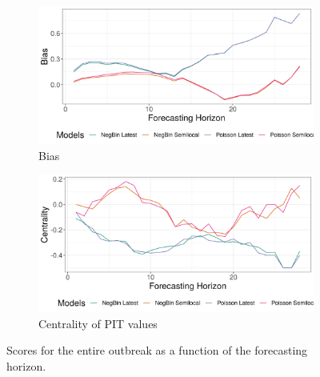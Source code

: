 \begin{figure}[H]
\begin{subfigure}{0.5\textwidth}
  \centering
  \includegraphics[width=\linewidth]{../output/Kayna_bias.png}  
  \caption{Bias}
  \label{fig:sub-third}
\end{subfigure}
\begin{subfigure}{0.5\textwidth}
  \centering
  \includegraphics[width=\linewidth]{../output/Kayna_centrality.png}  
  \caption{Centrality of PIT values}
  \label{fig:nat_scores_4}
\end{subfigure}
  \caption{Scores for the entire outbreak as a function of the forecasting horizon.}

  \label{fig:nat_scores}
\end{figure}

